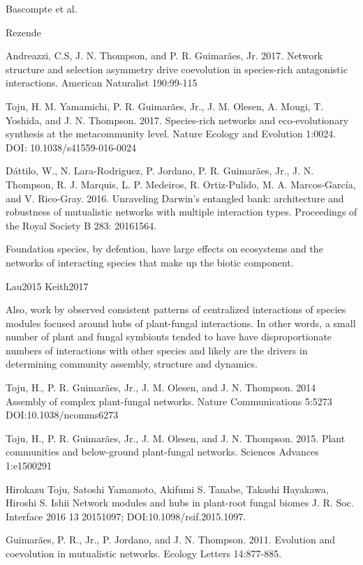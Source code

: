 \documentclass[fleqn,10pt]{wlscirep}
\begin{document}
Bascompte et al. 

Rezende

Andreazzi, C.S, J. N. Thompson, and P. R. Guimarães, Jr. 2017. Network
structure and selection asymmetry drive coevolution in species-rich
antagonistic interactions. American Naturalist 190:99-115

Toju, H. M. Yamamichi, P. R. Guimarães, Jr., J. M. Olesen, A. Mougi,
T. Yoshida, and J. N. Thompson. 2017. Species-rich networks and
eco-evolutionary synthesis at the metacommunity level. Nature Ecology
and Evolution 1:0024. DOI: 10.1038/s41559-016-0024

Dáttilo, W., N. Lara-Rodriguez, P. Jordano, P. R. Guimarães, Jr.,
J. N. Thompson, R. J. Marquis, L. P. Medeiros, R. Ortiz-Pulido,
M. A. Marcos-García, and V. Rico-Gray. 2016. Unraveling Darwin's
entangled bank: architecture and robustness of mutualistic networks
with multiple interaction types. Proceedings of the Royal Society B
283: 20161564.


Foundation species, by defention, have large effects on ecosystems and
the networks of interacting species that make up the biotic component. 

\citep{Ellison2005}

Lau2015
Keith2017

Also, work by \citep{Toju 2018, Toju2015, Toju2014} observed consistent patterns
of centralized interactions of species modules focused around hubs of
plant-fungal interactions. In other words, a small number of plant and
fungal symbionts tended to have have disproportionate numbers of
interactions with other species and likely are the drivers in
determining community assembly, structure and dynamics. 



Toju, H., P. R. Guimarães, Jr., J. M. Olesen, and J. N. Thompson. 2014
Assembly of complex plant-fungal networks. Nature Communications
5:5273 DOI:10.1038/ncomms6273

Toju, H., P. R. Guimarães, Jr., J. M. Olesen, and
J. N. Thompson. 2015. Plant communities and below-ground plant-fungal
networks. Sciences Advances 1:e1500291

Hirokazu Toju, Satoshi Yamamoto, Akifumi S. Tanabe, Takashi Hayakawa,
Hiroshi S. Ishii Network modules and hubs in plant-root fungal biomes
J. R. Soc. Interface 2016 13 20151097; DOI:10.1098/rsif.2015.1097. 




Guimarães, P. R., Jr., P. Jordano, and J. N. Thompson. 2011. Evolution
and coevolution in mutualistic networks. Ecology Letters 14:877-885.
\end{document}
